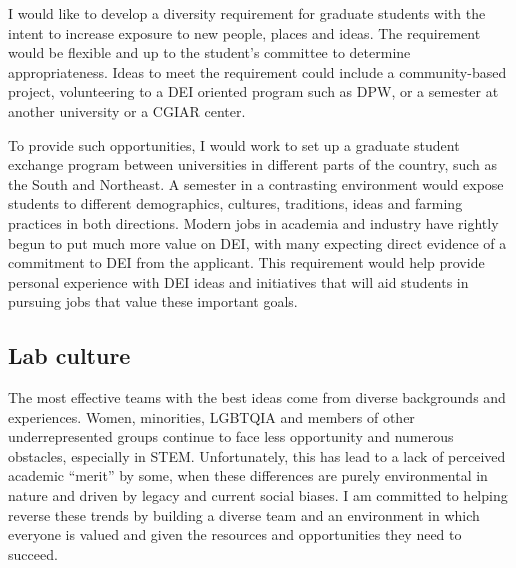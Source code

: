 \documentclass[11pt]{article}
\newcommand{\nicholas}[1]{{\color{nicholasCol} [\textbf{NS:} #1 (\today\ \currenttime)]}}
\begin{document}
I would like to develop a diversity requirement for graduate students with the intent to increase exposure to new people, places and ideas. The requirement would be flexible and up to the student's committee to determine appropriateness. Ideas to meet the requirement could include a community-based project, volunteering to a DEI oriented program such as DPW, or a semester at another university or a CGIAR center. %

To provide such opportunities, I would work to set up a graduate student exchange program between universities in different parts of the country, such as the South and Northeast. A semester in a contrasting environment would expose students to different demographics, cultures, traditions, ideas and farming practices in both directions. Modern jobs in academia and industry have rightly begun to put much more value on DEI, with many expecting direct evidence of a commitment to DEI from the applicant. This requirement would help provide personal experience with DEI ideas and initiatives that will aid students in pursuing jobs that value these important goals.%





\subsection*{Lab culture}




The most effective teams with the best ideas come from diverse backgrounds and experiences. Women, minorities, LGBTQIA and members of other underrepresented groups continue to face less opportunity and numerous obstacles, especially in STEM. Unfortunately, this has lead to a lack of perceived academic ``merit'' by some, when these differences are purely environmental in nature and driven by legacy and current social biases. I am committed to helping reverse these trends by building a diverse team and an environment in which everyone is valued and given the resources and opportunities they need to succeed. 
\end{document}
